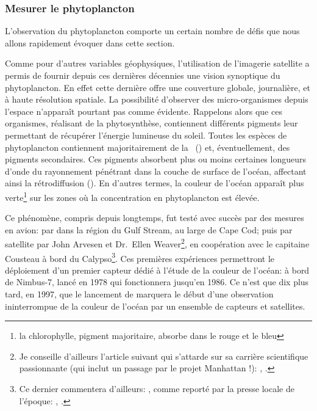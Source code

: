 
\begin{figure}
  \centering
  \label{fig:pompe-bio}
\end{figure}

\subsubsection{Mesurer le phytoplancton}
\label{sec:teledetection}

L'observation du phytoplancton comporte un certain nombre de défis que nous allons rapidement évoquer dans cette section.

Comme pour d'autres variables géophysiques, l'utilisation de l'imagerie satellite a permis de fournir depuis ces dernières décennies une vision synoptique du phytoplancton.
En effet cette dernière offre une couverture globale, journalière, et à haute résolution spatiale.
La possibilité d'observer des micro-organismes depuis l'espace n'apparaît pourtant pas comme évidente.
Rappelons alors que ces organismes, réalisant de la phytosynthèse, contiennent différents pigments leur permettant de récupérer l'énergie lumineuse du soleil.
Toutes les espèces de phytoplancton contiennent majoritairement de la ~() et, éventuellement, des pigments secondaires.
Ces pigments absorbent plus ou moins certaines longueurs d'onde du rayonnement pénétrant dans la couche de surface de l'océan, affectant ainsi la rétrodiffusion ().
En d'autres termes, la couleur de l'océan apparaît plus verte\footnote{%
  la chlorophylle, pigment majoritaire, absorbe dans le rouge et le bleu}
sur les zones où la concentration en phytoplancton est élevée.

Ce phénomène, compris depuis longtemps, fut testé avec succès par des mesures en avion:  par \textcite{clarke_1970} dans la région du Gulf Stream, au large de Cape Cod; puis par satellite par John Arvesen et Dr.\ Ellen Weaver\footnote{%
  Je conseille d'ailleurs l'article suivant qui s'attarde sur sa carrière scientifique passionnante (qui inclut un passage par le projet Manhattan !): , \cite{marshall_2010}.},
en coopération avec le capitaine Cousteau à bord du Calypso\footnote{%
  Ce dernier commentera d'ailleurs: , comme reporté par la presse locale de l'époque:
  , \cite{macomber_1973}.
}.
Ces premières expériences permettront le déploiement d'un premier capteur dédié à l'étude de la couleur de l'océan:  à bord de Nimbus-7, lancé en 1978 qui fonctionnera jusqu'en 1986.
Ce n'est que dix plus tard, en 1997, que le lancement de  marquera le début d'une observation ininterrompue de la couleur de l'océan par un ensemble de capteurs et satellites.

